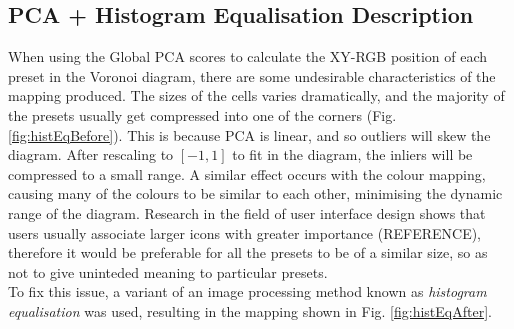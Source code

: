 \documentclass[11pt, oneside]{report}   	%
\begin{document}
\subsection{PCA + Histogram Equalisation Description}
When using the Global PCA scores to calculate the XY-RGB position of each preset in the Voronoi diagram, there are some undesirable characteristics of the mapping produced. The sizes of the cells varies dramatically, and the majority of the presets usually get compressed into one of the corners (Fig. \ref{fig:histEqBefore}). This is because PCA is linear, and so outliers will skew the diagram. After rescaling to $[-1, 1]$ to fit in the diagram, the inliers will be compressed to a small range. A similar effect occurs with the colour mapping, causing many of the colours to be similar to each other, minimising the dynamic range of the diagram. Research in the field of user interface design shows that users usually associate larger icons with greater importance (REFERENCE), therefore it would be preferable for all the presets to be of a similar size, so as not to give uninteded meaning to particular presets.\\
To fix this issue, a variant of an image processing method known as \emph{histogram equalisation} \cite{HistogramEqualisation} was used, resulting in the mapping shown in Fig. \ref{fig:histEqAfter}.
\end{document}

